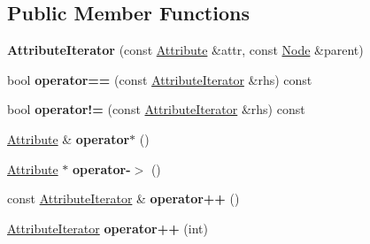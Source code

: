 \subsection*{Public Member Functions}
\begin{DoxyCompactItemize}
\item 
\hypertarget{classphys_1_1xml_1_1AttributeIterator_ae338589383381586c8d8e5d893e498be}{
{\bfseries AttributeIterator} (const \hyperlink{classphys_1_1xml_1_1Attribute}{Attribute} \&attr, const \hyperlink{classphys_1_1xml_1_1Node}{Node} \&parent)}
\label{de/d78/classphys_1_1xml_1_1AttributeIterator_ae338589383381586c8d8e5d893e498be}

\item 
\hypertarget{classphys_1_1xml_1_1AttributeIterator_a5310ea26bd19cb1c32e962c03ea0dc62}{
bool {\bfseries operator==} (const \hyperlink{classphys_1_1xml_1_1AttributeIterator}{AttributeIterator} \&rhs) const }
\label{de/d78/classphys_1_1xml_1_1AttributeIterator_a5310ea26bd19cb1c32e962c03ea0dc62}

\item 
\hypertarget{classphys_1_1xml_1_1AttributeIterator_a6b80c4c5317f97921511e25597a3403f}{
bool {\bfseries operator!=} (const \hyperlink{classphys_1_1xml_1_1AttributeIterator}{AttributeIterator} \&rhs) const }
\label{de/d78/classphys_1_1xml_1_1AttributeIterator_a6b80c4c5317f97921511e25597a3403f}

\item 
\hypertarget{classphys_1_1xml_1_1AttributeIterator_a28e8472f82ffc6f8eb2750c0c7e60e69}{
\hyperlink{classphys_1_1xml_1_1Attribute}{Attribute} \& {\bfseries operator$\ast$} ()}
\label{de/d78/classphys_1_1xml_1_1AttributeIterator_a28e8472f82ffc6f8eb2750c0c7e60e69}

\item 
\hypertarget{classphys_1_1xml_1_1AttributeIterator_a7db7ffe3eebe1e4d5d9cb2623fc2d019}{
\hyperlink{classphys_1_1xml_1_1Attribute}{Attribute} $\ast$ {\bfseries operator-\/$>$} ()}
\label{de/d78/classphys_1_1xml_1_1AttributeIterator_a7db7ffe3eebe1e4d5d9cb2623fc2d019}

\item 
\hypertarget{classphys_1_1xml_1_1AttributeIterator_a471aae245b01fe34589c15df6afbcc0e}{
const \hyperlink{classphys_1_1xml_1_1AttributeIterator}{AttributeIterator} \& {\bfseries operator++} ()}
\label{de/d78/classphys_1_1xml_1_1AttributeIterator_a471aae245b01fe34589c15df6afbcc0e}

\item 
\hypertarget{classphys_1_1xml_1_1AttributeIterator_a9925e89424ac0d02453df60b4a8f21a7}{
\hyperlink{classphys_1_1xml_1_1AttributeIterator}{AttributeIterator} {\bfseries operator++} (int)}
\label{de/d78/classphys_1_1xml_1_1AttributeIterator_a9925e89424ac0d02453df60b4a8f21a7}


\end{DoxyCompactItemize}
